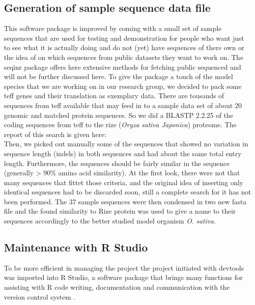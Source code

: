 \subsection{Generation of sample sequence data file}
This software package is improved by coming with a small set of sample sequences that are used for testing and demonstration for people who want just to see what it is actually doing and do not (yet) have sequences of there own or the idea of on which sequences from public datasets they want to work on. The seqinr package offers here extensive methods for fetching public sequenced and will not be further discussed here. 
To give the package a touch of the model species that we are working on in our research group, we decided to pack some teff genes and their translation as exemplary data. There are tousands of sequences from teff available that may feed in to a sample data set of about 20 genomic and matched protein sequences. So we did a BLASTP 2.2.25 of the coding sequences from teff to the rize (\textit{Oryza sativa Japonica}) proteome. The report of this search is given here:\\
  
Then, we picked out manually some of the sequences that showed no variation in sequence length (indels) in both sequences and had about the same total entry length. Furthermore, the sequences should be fairly similar in the sequence (generally > 90\% amino acid similarity). At the first look, there were not that many sequences that fittet those criteria, and the original idea of inserting only identical sequences had to be discarded soon, still a complete search for it has not been performed. The 37 sample sequences were then condensed in two new fasta file and the found similarity to Rize protein was used to give a name to their sequences accordingly to the better studied model organism \textit{O. sativa}.

\subsection{Maintenance with R Studio}
To be more efficient in managing the project the project initiated with devtools was imported into R Studio, a software package that brings many functions for assisting with R code writing, documentation and communication with the version control system \cite{Rstudio2015}. 


